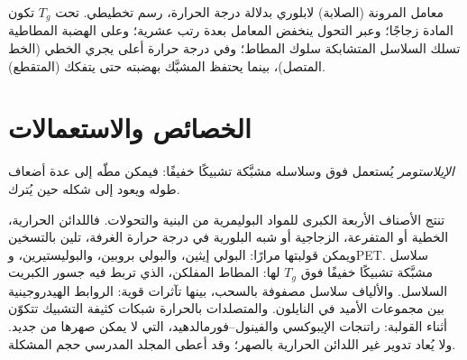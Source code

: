 \begin{omfigure}
\par\vspace{4pt}

{\small معامل المرونة (الصلابة)  لابلوري بدلالة درجة الحرارة، رسم تخطيطي. تحت $T_g$ تكون
المادة زجاجًا؛ وعبر التحول ينخفض المعامل بعدة رتب عشرية؛ وعلى الهضبة
المطاطية تسلك السلاسل المتشابكة سلوك المطاط؛ وفي درجة حرارة أعلى يجري  الخطي (الخط
المتصل)، بينما يحتفظ  المشبَّك بهضبته حتى يتفكك (المتقطع).}
\end{omfigure}

\section{الخصائص والاستعمالات}

\begin{definition}[الإيلاستومر]\label{def:b2:polymer-synthesis:elastomer}
\emph{الإيلاستومر}  يُستعمل فوق  وسلاسله
مشبَّكة تشبيكًا خفيفًا: فيمكن مطّه إلى عدة أضعاف طوله ويعود إلى
شكله حين يُترك.
\end{definition}

تنتج الأصناف الأربعة الكبرى للمواد البوليمرية من البنية والتحولات. فاللدائن الحرارية،
الخطية أو المتفرعة، الزجاجية أو شبه البلورية في درجة حرارة الغرفة، تلين بالتسخين ويمكن
قولبتها مرارًا: البولي إيثين، والبولي بروبين، والبوليستيرين، وPET.  سلاسل مشبَّكة
تشبيكًا خفيفًا فوق $T_g$ لها: المطاط المفلكن، الذي تربط فيه جسور الكبريت السلاسل.
والألياف سلاسل مصفوفة بالسحب، بينها تآثرات قوية: الروابط الهيدروجينية بين
مجموعات الأميد في النايلون. والمتصلدات بالحرارة شبكات كثيفة التشبيك تتكوّن أثناء القولبة: راتنجات الإيبوكسي 
والفينول--فورمالدهيد، التي لا يمكن صهرها من جديد. ولا يُعاد تدوير غير اللدائن الحرارية بالصهر؛ وقد
أعطى المجلد المدرسي حجم المشكلة.

